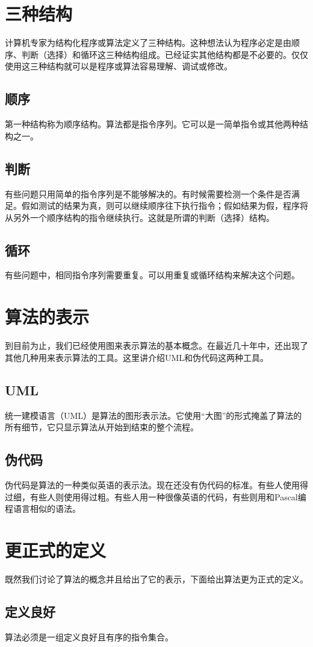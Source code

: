 \section{三种结构}
计算机专家为结构化程序或算法定义了三种结构。这种想法认为程序必定是由顺序、判断（选择）和循环这三种结构组成。已经证实其他结构都是不必要的。仅仅使用这三种结构就可以是程序或算法容易理解、调试或修改。
\subsection{顺序}
第一种结构称为顺序结构。算法都是指令序列。它可以是一简单指令或其他两种结构之一。
\subsection{判断}
有些问题只用简单的指令序列是不能够解决的。有时候需要检测一个条件是否满足。假如测试的结果为真，则可以继续顺序往下执行指令；假如结果为假，程序将从另外一个顺序结构的指令继续执行。这就是所谓的判断（选择）结构。
\subsection{循环}
有些问题中，相同指令序列需要重复。可以用重复或循环结构来解决这个问题。
\section{算法的表示}
到目前为止，我们已经使用图来表示算法的基本概念。在最近几十年中，还出现了其他几种用来表示算法的工具。这里讲介绍UML和伪代码这两种工具。
\subsection{UML}
统一建模语言（UML）是算法的图形表示法。它使用“大图”的形式掩盖了算法的所有细节，它只显示算法从开始到结束的整个流程。
\subsection{伪代码}
伪代码是算法的一种类似英语的表示法。现在还没有伪代码的标准。有些人使用得过细，有些人则使用得过粗。有些人用一种很像英语的代码，有些则用和Pascal编程语言相似的语法。
\section{更正式的定义}
既然我们讨论了算法的概念并且给出了它的表示，下面给出算法更为正式的定义。
\subsection{定义良好}
算法必须是一组定义良好且有序的指令集合。
